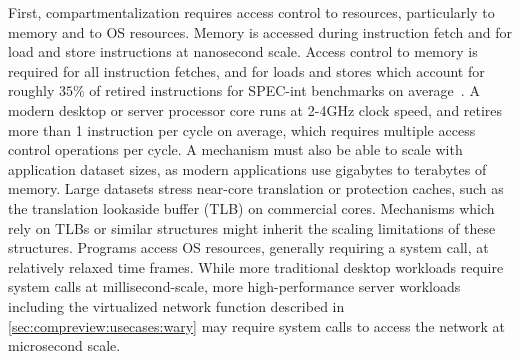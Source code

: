 First, compartmentalization requires access control to resources, particularly
to memory and to OS resources.
Memory is accessed during instruction fetch and for load and store instructions
at nanosecond scale.
Access control to memory is required for all instruction fetches, and for
loads and stores which account for roughly $35\%$ of retired instructions
for SPEC-int benchmarks on average~\cite{LimayeA18}.
A modern desktop or server processor core runs at 2-4GHz clock speed, and
retires more than 1 instruction per cycle on average, which requires
multiple access control operations per cycle.
A mechanism must also be able to scale with application dataset sizes, as
modern applications use gigabytes to terabytes of memory.
Large datasets stress near-core translation or protection caches, such as
the translation lookaside buffer (TLB) on commercial cores.
Mechanisms which rely on TLBs or similar structures might inherit the
scaling limitations of these structures.
Programs access OS resources, generally requiring a system call, at
relatively relaxed time frames.
While more traditional desktop workloads require system calls at 
millisecond-scale, more high-performance server workloads including the
virtualized network function described in 
\autoref{sec:compreview:usecases:wary} may require system calls to access
the network at microsecond scale.

